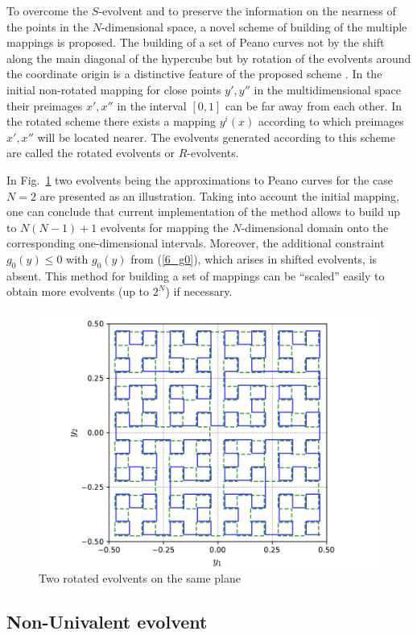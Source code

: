 \documentclass[runningheads]{llncs}
\begin{document}
To overcome the $S$-evolvent and to preserve the information on the nearness of the points in
the $N$-dimensional space, a novel scheme of building of the multiple mappings is proposed.
The building of a set of Peano curves not by the shift along the main diagonal of the hypercube
but by rotation of the evolvents around the coordinate origin is a distinctive feature of the
proposed scheme \cite{Gergel2009}. In the initial non-rotated mapping for close points $y', y''$
in the multidimensional space their preimages  $x', x''$ in the interval $[0,1]$ can be far away
from each other. In the rotated scheme there exists a mapping $y^i(x)$ according to which
preimages $x', x''$ will be located nearer. The evolvents generated according to this scheme are
called the rotated evolvents or $R$-evolvents.

In Fig.~\ref{6_fig_9} two evolvents being the approximations to Peano curves for the case
$N=2$ are presented as an illustration.
Taking into account the initial mapping, one can conclude that current implementation of the
method allows to build up to $N(N-1)+1$ evolvents for mapping the $N$-dimensional domain
onto the corresponding one-dimensional intervals. Moreover, the additional constraint  $g_0(y)
\leq 0$ with $g_0(y)$ from (\ref{6_g0}), which arises in shifted evolvents, is absent. This
method for building a set of mappings can be ``scaled'' easily to obtain more evolvents (up to
$2^N$) if necessary.

\begin{figure}[t]
  \centering
  \includegraphics[width=0.6\linewidth]{pictures/rotated.pdf}
  \caption{Two rotated evolvents on the same plane}
  \label{6_fig_9}
\end{figure}

\subsection{Non-Univalent evolvent}
\end{document}
